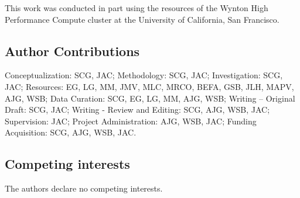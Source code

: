 This work was conducted in part using the resources of the Wynton High Performance Compute cluster at the University of California, San Francisco.

\subsection{Author Contributions}
Conceptualization: SCG, JAC; Methodology: SCG, JAC; Investigation: SCG, JAC; Resources: EG, LG, MM, JMV, MLC, MRCO, BEFA, GSB, JLH, MAPV, AJG, WSB; Data Curation: SCG, EG, LG, MM, AJG, WSB; Writing – Original Draft: SCG, JAC; Writing - Review and Editing: SCG, AJG, WSB, JAC; Supervision: JAC; Project Administration: AJG, WSB, JAC; Funding Acquisition: SCG, AJG, WSB, JAC.

\subsection{Competing interests}
The authors declare no competing interests.

\clearpage



